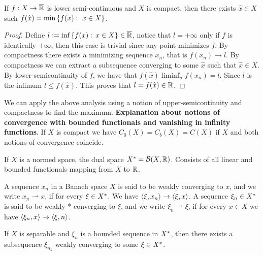 \begin{theorem}
	If $f: X\rightarrow\overline{\mathbb{R}}$ is lower semi-continuous and $X$ is compact, then there exists $\hat x \in X$ such $f(\hat x)=\min\left\lbrace f(x):\ x\in X \right\rbrace$.
	\begin{proof}
		Define $l:=\inf\left\lbrace f(x): \, x \in X \right\rbrace \in \overline{\mathbb{R}}$, notice that $l=+\infty$ only if $f$ is identically $+\infty$, then this case is trivial since any point minimizes $f$. By compactness there exists a minimizing sequence $x_n$, that is $f(x_n)\rightarrow l$. By compactness we can extract a subsequence converging to some $\hat x$ such that $\hat x \in X$. By lower-semicontinuity of $f$, we have that $f(\hat x)\liminf_n f(x_n)=l$. Since $l$ is the infimum $l\leq f(\hat x)$. This proves that $l=f(\hat{x}) \in \mathbb{R}$.
	\end{proof}
\end{theorem}

We can apply the above analysis using a notion of upper-semicontinuity and compactness to find the maximum. \textbf{Explanation about notions of convergence with bounded functionals and vanishing in infinity functions}. If $X$ is compact we have $C_0(X)=C_b(X)=C(X)$ if $X$ and both notions of convergence coincide.

\begin{definition}
	If $X$ is a normed space, the dual space ${X}^*=\mathcal B(X, \mathbb{R})$. Consists of all linear and bounded functionals mapping from $X$ to $\mathbb{R}$.
\end{definition}

\begin{definition}
	A sequence $x_n$ in a Banach space $X$ is said to be weakly converging to $x$, and we write $x_n \rightharpoonup x$, if for every $\xi \in {X}^*$. We have $\left\langle \xi, x_n \right\rangle\rightarrow \left\langle \xi, x \right\rangle$. A sequence $\xi_n \in {X}^*$ is said to be weakly-* converging to $\xi$, and we write $\xi_n \rightharpoonup \xi$, if for every $x\in X$ we have $\left\langle \xi_n, x \right\rangle \rightarrow \left\langle \xi, n \right\rangle$.
\end{definition}

\begin{theorem}
	If $X$ is separable and $\xi_n$ is a bounded sequence in ${X}^*$, then there exists a subsequence $\xi_{n_k}$ weakly converging to some $\xi \in {X}^*$.
\end{theorem}

